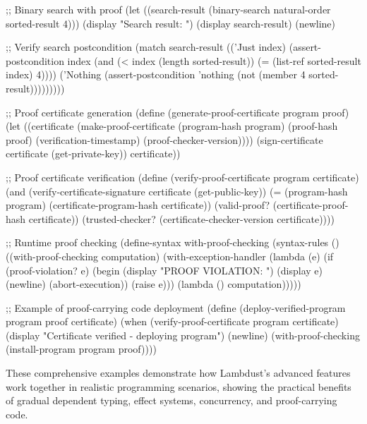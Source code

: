 \begin{example}
\begin{lambdustcode}
      ;; Binary search with proof
      (let ((search-result (binary-search natural-order sorted-result 4)))
        (display "Search result: ") (display search-result) (newline)
        
        ;; Verify search postcondition
        (match search-result
          (('Just index)
           (assert-postcondition index
             (and (< index (length sorted-result))
                  (= (list-ref sorted-result index) 4))))
          ('Nothing
           (assert-postcondition 'nothing
             (not (member 4 sorted-result)))))))))

;; Proof certificate generation
(define (generate-proof-certificate program proof)
  (let ((certificate 
          (make-proof-certificate
            (program-hash program)
            (proof-hash proof)
            (verification-timestamp)
            (proof-checker-version))))
    (sign-certificate certificate (get-private-key))
    certificate))

;; Proof certificate verification
(define (verify-proof-certificate program certificate)
  (and (verify-certificate-signature certificate (get-public-key))
       (= (program-hash program) (certificate-program-hash certificate))
       (valid-proof? (certificate-proof-hash certificate))
       (trusted-checker? (certificate-checker-version certificate))))

;; Runtime proof checking
(define-syntax with-proof-checking
  (syntax-rules ()
    ((with-proof-checking computation)
     (with-exception-handler
       (lambda (e)
         (if (proof-violation? e)
             (begin
               (display "PROOF VIOLATION: ") (display e) (newline)
               (abort-execution))
             (raise e)))
       (lambda () computation)))))

;; Example of proof-carrying code deployment
(define (deploy-verified-program program proof certificate)
  (when (verify-proof-certificate program certificate)
    (display "Certificate verified - deploying program") (newline)
    (with-proof-checking
      (install-program program proof))))
\end{lambdustcode}
\end{example}

These comprehensive examples demonstrate how Lambdust's advanced features work together in realistic programming scenarios, showing the practical benefits of gradual dependent typing, effect systems, concurrency, and proof-carrying code.